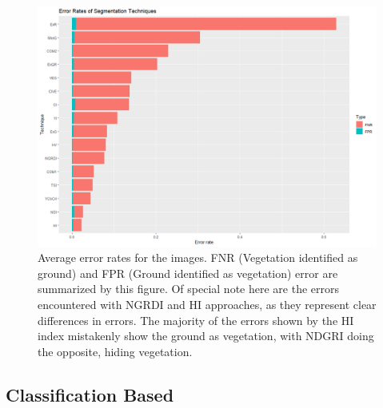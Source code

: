 \documentclass[agriculture,article,submit,pdftex,moreauthors]{Definitions/mdpi}
\begin{document}
\begin{figure}[h]
	\centering
	\includegraphics[width=.80\linewidth]{figures/segmentation-error-rates.png}
	\caption[Error rates of segmentation algorithms]{Average error rates for the images. FNR (Vegetation identified as ground) and FPR (Ground identified as vegetation) error are summarized by this figure. Of special note here are the errors encountered with NGRDI and HI approaches, as they represent clear differences in errors. The majority of the errors shown by the HI index mistakenly show the ground as vegetation, with NDGRI  doing the opposite, hiding vegetation.}
	\label{fig:segmentation-errors}
\end{figure}

\subsection{Classification Based}
%
\end{document}
